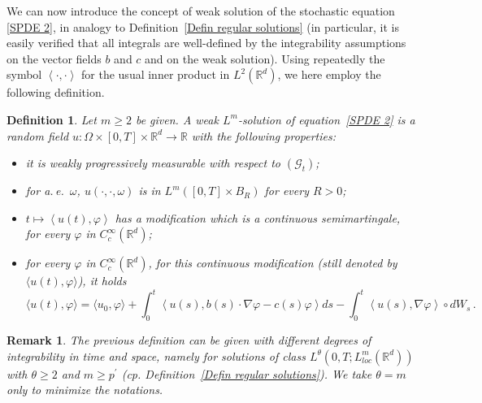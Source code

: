 \documentclass[a4paper,10pt]{article}
\newtheorem{definition}[theorem]{Definition}
\newtheorem{remark}[theorem]{Remark}
\newcommand{\lan}{\langle}
\newcommand{\ran}{\rangle}
\begin{document}
We can now introduce the concept of weak solution of the stochastic equation \eqref{SPDE 2}, in analogy to Definition~\ref{Defin regular solutions} (in particular, it is easily verified that all integrals are well-defined by the integrability assumptions on the vector fields $b$ and $c$ and on the weak solution). Using repeatedly the symbol $\left\langle \cdot,\cdot\right\rangle $ for the usual inner product in $L^{2}(\mathbb{R}^{d})$, we here employ the following definition.

\begin{definition}
\label{Def weak sol SPDE}
Let $m\geq2$ be given. A weak $L^{m}$-solution of equation~\eqref{SPDE 2} is a random field $u \colon \Omega\times [0,T]
\times\mathbb{R}^{d}\rightarrow\mathbb{R}$ with the following properties:

\begin{itemize}
  \item it is weakly progressively measurable with respect to $(\mathcal{G}_{t})$;
  \item for a.\,e.\ $\omega$, $u(\cdot,\cdot,\omega)$ is in $L^{m}([0,T] \times B_{R})$ for every $R>0$;
  \item $t\mapsto\left\langle u(t)  ,\varphi\right\rangle $ has a modification which 
  is a continuous semimartingale, for every $\varphi$ in $C_{c}^{\infty}(\mathbb{R}^{d})$;
  \item for every $\varphi$ in $C_{c}^{\infty}(\mathbb{R}^{d})$, for this continuous modification (still denoted by $\lan u(t),\varphi\ran$), it holds
\[\label{formulation_SPDE2}
\langle u(t)  ,\varphi\rangle=\langle u_{0},\varphi\rangle 
+\int_{0}^{t}\left\langle u(s)  ,b(s)  \cdot
\nabla\varphi-c(s)  \varphi\right\rangle ds-\int_{0}^{t}\left\langle u(s)  ,\nabla\varphi\right\rangle \circ dW_{s} \, .
\]
\end{itemize}
\end{definition}

\begin{remark}
The previous definition can be given with different degrees of integrability
in time and space, namely for solutions of class $L^{\theta}(
0,T;L_{loc}^{m}(\mathbb{R}^{d}))$ with $\theta\geq2$ and $m\geq p^{\prime}$ (cp. Definition~\ref{Defin regular solutions}). We take $\theta=m$ only to minimize the notations.
\end{remark}
\end{document}

